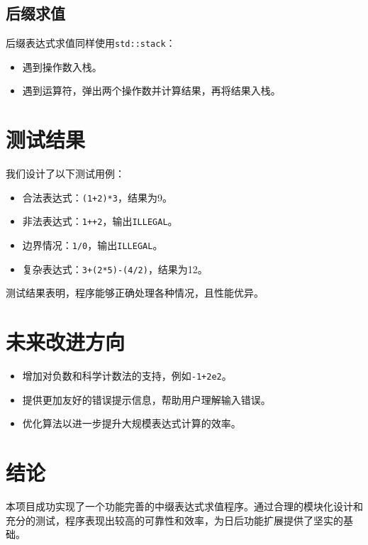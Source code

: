 \documentclass{article}
\begin{document}
\subsection{后缀求值}
后缀表达式求值同样使用\texttt{std::stack}：
\begin{itemize}
    \item 遇到操作数入栈。
    \item 遇到运算符，弹出两个操作数并计算结果，再将结果入栈。
\end{itemize}

\section{测试结果}
我们设计了以下测试用例：
\begin{itemize}
    \item 合法表达式：\texttt{(1+2)*3}，结果为9。
    \item 非法表达式：\texttt{1++2}，输出\texttt{ILLEGAL}。
    \item 边界情况：\texttt{1/0}，输出\texttt{ILLEGAL}。
    \item 复杂表达式：\texttt{3+(2*5)-(4/2)}，结果为12。
\end{itemize}

测试结果表明，程序能够正确处理各种情况，且性能优异。

\section{未来改进方向}
\begin{itemize}
    \item 增加对负数和科学计数法的支持，例如\texttt{-1+2e2}。
    \item 提供更加友好的错误提示信息，帮助用户理解输入错误。
    \item 优化算法以进一步提升大规模表达式计算的效率。
\end{itemize}

\section*{结论}
本项目成功实现了一个功能完善的中缀表达式求值程序。通过合理的模块化设计和充分的测试，程序表现出较高的可靠性和效率，为日后功能扩展提供了坚实的基础。
\end{document}
